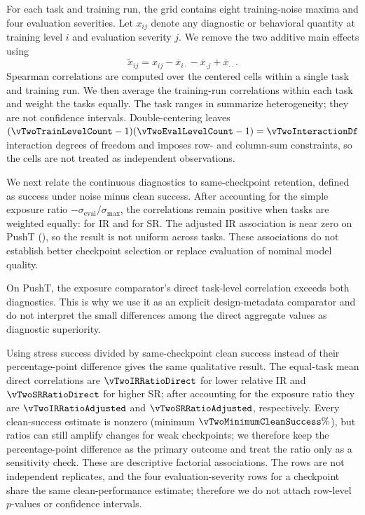 For each task and training run, the grid contains eight training-noise maxima
and four evaluation severities. Let $x_{ij}$ denote any diagnostic or behavioral
quantity at training level $i$ and evaluation severity $j$. We remove the two
additive main effects using
\[
\widetilde{x}_{ij}
=x_{ij}-\overline{x}_{i\cdot}-\overline{x}_{\cdot j}
+\overline{x}_{\cdot\cdot}.
\]
Spearman correlations are computed over the \vTwoFactorialCellCount{} centered
cells within a single task and training run. We then average the
\vTwoRunCount{} training-run correlations within each task and weight the
\vTwoTaskCount{} tasks equally. The task ranges in
 summarize heterogeneity; they are not
confidence intervals. Double-centering leaves
$(\vTwoTrainLevelCount-1)(\vTwoEvalLevelCount-1)=\vTwoInteractionDf$
interaction degrees of freedom and imposes row- and column-sum constraints, so
the \vTwoFactorialCellCount{} cells are not treated as independent observations.


\FloatBarrier

We next relate the continuous diagnostics to same-checkpoint retention,
defined as success under noise minus clean success. After accounting for the
simple exposure ratio $-\sigma_{\mathrm{eval}}/\sigma_{\max}$, the correlations
remain positive when tasks are weighted equally: \vTwoIRAdjusted{} for IR and
\vTwoSRAdjusted{} for SR.
The adjusted IR
association is near zero on PushT (\vTwoIRAdjustedPushT{}), so the result is not
uniform across tasks. These associations do not establish
better checkpoint selection or replace evaluation of nominal model quality.

On PushT, the exposure comparator's direct task-level correlation exceeds both
diagnostics. This is why we use it as an explicit design-metadata comparator
and do not interpret the small differences among the direct aggregate values as
diagnostic superiority.

Using stress success divided by same-checkpoint clean success instead of their
percentage-point difference gives the same qualitative result. The equal-task
mean direct correlations are $\vTwoIRRatioDirect$ for lower relative IR and
$\vTwoSRRatioDirect$ for higher SR; after accounting for the exposure ratio
they are $\vTwoIRRatioAdjusted$ and $\vTwoSRRatioAdjusted$, respectively.
Every clean-success estimate is nonzero (minimum
$\vTwoMinimumCleanSuccess\%$), but ratios can still amplify changes for weak
checkpoints; we therefore keep the percentage-point difference as the primary
outcome and treat the ratio only as a sensitivity check. These are descriptive
factorial associations. The \vTwoRowCount{} rows are not independent
replicates, and the four evaluation-severity rows for a checkpoint share the
same clean-performance estimate; therefore we do not attach row-level
$p$-values or confidence intervals.
